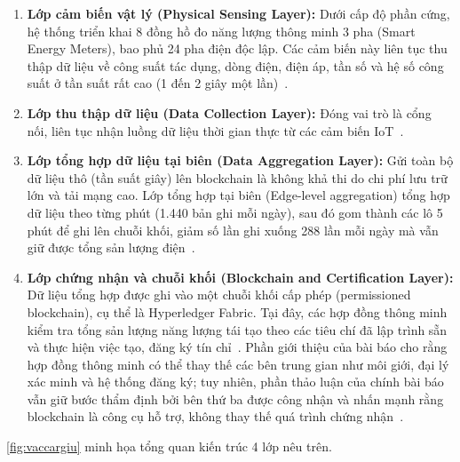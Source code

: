 \begin{enumerate}
    \item \textbf{Lớp cảm biến vật lý (Physical Sensing Layer):} Dưới cấp độ phần cứng, hệ thống triển khai 8 đồng hồ đo năng lượng thông minh 3 pha (Smart Energy Meters), bao phủ 24 pha điện độc lập. Các cảm biến này liên tục thu thập dữ liệu về công suất tác dụng, dòng điện, điện áp, tần số và hệ số công suất ở tần suất rất cao (1 đến 2 giây một lần)~\cite{vaccargiu2026blockchain}.
    \item \textbf{Lớp thu thập dữ liệu (Data Collection Layer):} Đóng vai trò là cổng nối, liên tục nhận luồng dữ liệu thời gian thực từ các cảm biến IoT~\cite{vaccargiu2026blockchain}.
    \item \textbf{Lớp tổng hợp dữ liệu tại biên (Data Aggregation Layer):} Gửi toàn bộ dữ liệu thô (tần suất giây) lên blockchain là không khả thi do chi phí lưu trữ lớn và tải mạng cao. Lớp tổng hợp tại biên (Edge-level aggregation) tổng hợp dữ liệu theo từng phút (1.440 bản ghi mỗi ngày), sau đó gom thành các lô 5 phút để ghi lên chuỗi khối, giảm số lần ghi xuống 288 lần mỗi ngày mà vẫn giữ được tổng sản lượng điện~\cite{vaccargiu2026blockchain}.
    \item \textbf{Lớp chứng nhận và chuỗi khối (Blockchain and Certification Layer):} Dữ liệu tổng hợp được ghi vào một chuỗi khối cấp phép (permissioned blockchain), cụ thể là Hyperledger Fabric. Tại đây, các hợp đồng thông minh kiểm tra tổng sản lượng năng lượng tái tạo theo các tiêu chí đã lập trình sẵn và thực hiện việc tạo, đăng ký tín chỉ~\cite{vaccargiu2026blockchain}. Phần giới thiệu của bài báo cho rằng hợp đồng thông minh có thể thay thế các bên trung gian như môi giới, đại lý xác minh và hệ thống đăng ký; tuy nhiên, phần thảo luận của chính bài báo vẫn giữ bước thẩm định bởi bên thứ ba được công nhận và nhấn mạnh rằng blockchain là công cụ hỗ trợ, không thay thế quá trình chứng nhận~\cite{vaccargiu2026blockchain}.
\end{enumerate}

\HinhVaccargiu

\autoref{fig:vaccargiu} minh họa tổng quan kiến trúc 4 lớp nêu trên.

